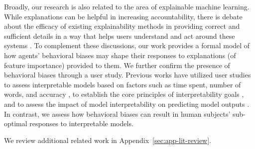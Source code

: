 Broadly, our research is also related to the area of explainable machine learning. While explanations can be helpful in increasing accountability, there is debate about the efficacy of existing explainability methods in providing correct and sufficient details in a way that helps users understand and act around these systems \cite{doshivelez2019accountabilityailawrole, kumar2020shapproblem, lakkaraju2020fool, adebayo2018sanity}. To complement these discussions, our work provides a formal model of how agents' behavioral biases may shape their responses to explanations (of feature importance) provided to them. We further confirm the presence of behavioral biases through a user study. Previous works have utilized user studies to assess interpretable models based on factors such as time spent, number of words, and accuracy \cite{lakkaraju2016decisionsets}, to establish the core principles of interpretability goals \cite{hong2020humanfactors}, and to assess the impact of model interpretability on predicting model outputs \cite{poursabzi2021manipulating}. In contrast, we assess how behavioral biases can result in human subjects' sub-optimal responses to interpretable models. 

We review additional related work in Appendix~\ref{sec:app-lit-review}.  
